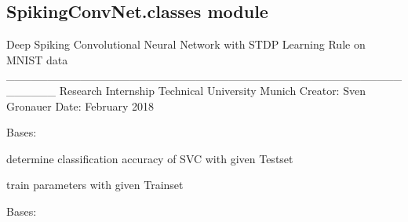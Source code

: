 \documentclass[letterpaper,10pt,english]{sphinxmanual}
\begin{document}
\subsection{SpikingConvNet.classes module}
\label{\detokenize{SpikingConvNet:module-SpikingConvNet.classes}}\label{\detokenize{SpikingConvNet:spikingconvnet-classes-module}}
Deep Spiking Convolutional Neural Network
with STDP Learning Rule on MNIST data
\_\_\_\_\_\_\_\_\_\_\_\_\_\_\_\_\_\_\_\_\_\_\_\_\_\_\_\_\_\_\_\_\_\_\_\_\_\_\_\_\_\_\_\_\_\_\_\_\_\_\_\_\_\_
Research Internship
Technical University Munich
Creator:    Sven Gronauer
Date:       February 2018

\begin{fulllineitems}
\label{\detokenize{SpikingConvNet:SpikingConvNet.classes.Classifier}}
Bases: {\hyperref[\detokenize{SpikingConvNet:SpikingConvNet.classes.Layer}]{}}

\begin{fulllineitems}
\label{\detokenize{SpikingConvNet:SpikingConvNet.classes.Classifier.classify}}
determine classification accuracy of SVC with given Testset

\end{fulllineitems}


\begin{fulllineitems}
\label{\detokenize{SpikingConvNet:SpikingConvNet.classes.Classifier.train}}
train parameters with given Trainset

\end{fulllineitems}


\end{fulllineitems}


\begin{fulllineitems}
\label{\detokenize{SpikingConvNet:SpikingConvNet.classes.ConvLayer}}
Bases: {\hyperref[\detokenize{SpikingConvNet:SpikingConvNet.classes.Layer}]{}}

\end{fulllineitems}
\end{document}
